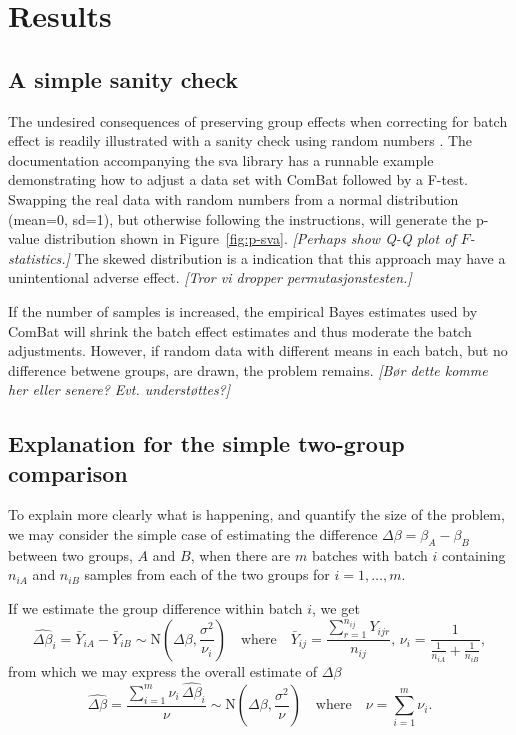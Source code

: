 \documentclass{bio}
\newcommand\NB[1]{\textcolor{NBcol}{\textit{#1}}}
\newcommand\NOTE[1]{\NB{[#1]}}
\begin{document}
\section{Results}

\subsection{A simple sanity check}

The undesired consequences of preserving group effects when correcting for batch effect is readily illustrated with a sanity check using random numbers . The documentation accompanying the sva library has a runnable example demonstrating how to adjust a data set with ComBat followed by a F-test. Swapping the real data with random numbers from a normal distribution (mean=0, sd=1), but otherwise following the instructions, will generate the p-value distribution shown in Figure~\ref{fig:p-sva}. \NOTE{Perhaps show Q-Q plot of $F$-statistics.} The skewed distribution is a indication that this approach may have a unintentional adverse effect. \NOTE{Tror vi dropper permutasjonstesten.}

If the number of samples is increased, the empirical Bayes estimates used by ComBat will shrink the batch effect estimates and thus moderate the batch adjustments. However, if random data with different means in each batch, but no difference betwene groups, are drawn, the problem remains. \NOTE{Bør dette komme her eller senere? Evt. understøttes?}


\subsection{Explanation for the simple two-group comparison}

To explain more clearly what is happening, and quantify the size of the problem, we may consider the simple case of estimating the difference $\Delta\beta=\beta_A-\beta_B$ between two groups, $A$ and $B$, when there are $m$ batches with batch $i$ containing $n_{iA}$ and $n_{iB}$ samples from each of the two groups for $i=1,\ldots,m$.

If we estimate the group difference within batch $i$, we get
\begin{equation}
\widehat{\Delta\beta}_i=\bar{Y}_{iA}-\bar{Y}_{iB}\sim\text{N}\left(\Delta\beta,\frac{\sigma^2}{\nu_i}\right)
\quad\text{where}\quad
\bar{Y}_{ij}=\frac{\sum_{r=1}^{n_{ij}}Y_{ijr}}{n_{ij}},\,
\nu_i=\frac{1}{\frac{1}{n_{iA}}+\frac{1}{n_{iB}}},
\end{equation}
from which we may express the overall estimate of $\Delta\beta$
\begin{equation}
\widehat{\Delta\beta}=\frac{\sum_{i=1}^m \nu_i\,\widehat{\Delta\beta}_i}{\nu}
\sim\text{N}\left(\Delta\beta,\frac{\sigma^2}{\nu}\right)
\quad\text{where}\quad
\nu=\sum_{i=1}^m\nu_i.
\end{equation}
\end{document}
